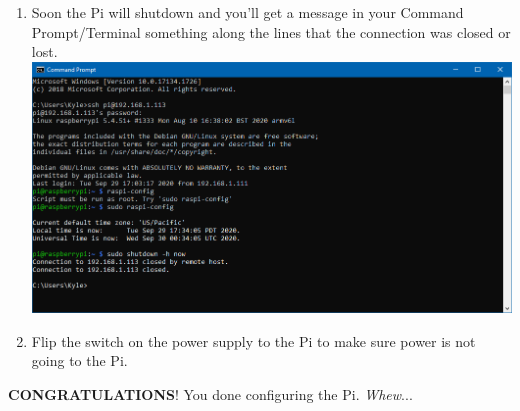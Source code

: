 \documentclass{article}
\begin{document}
\begin{enumerate}
  \item Soon the Pi will shutdown and you'll get a message in your Command Prompt/Terminal something along the lines that the connection was closed or lost. 
  \newline
  \newline
  \includegraphics[width=1.00\textwidth]{sshshutdown}
  \item Flip the switch on the power supply to the Pi to make sure power is not going to the Pi.
\end{enumerate}

\textbf{CONGRATULATIONS}! You done configuring the Pi. \textit{Whew}...
\end{document}
